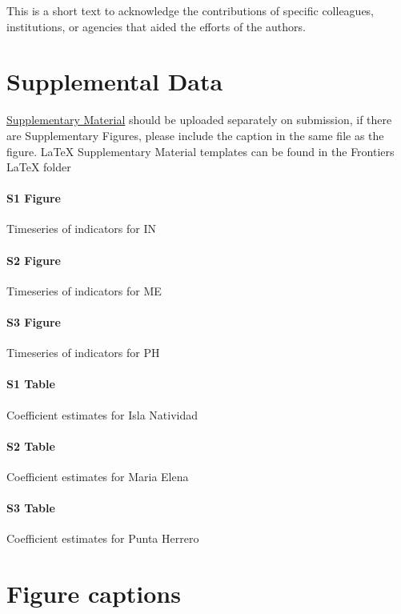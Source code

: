 \documentclass{frontiersSCNS}
\theoremstyle{definition}
\theoremstyle{definition}
\theoremstyle{definition}
\theoremstyle{remark}
\begin{document}
This is a short text to acknowledge the contributions of specific
colleagues, institutions, or agencies that aided the efforts of the
authors.

\section*{Supplemental Data}

\href{http://home.frontiersin.org/about/author-guidelines#SupplementaryMaterial}{Supplementary Material}
should be uploaded separately on submission, if there are Supplementary
Figures, please include the caption in the same file as the figure.
LaTeX Supplementary Material templates can be found in the Frontiers
LaTeX folder

\paragraph*{S1 Figure}
\label{S1_Figure}

Timeseries of indicators for IN

\paragraph*{S2 Figure}
\label{S2_Figure}

Timeseries of indicators for ME

\paragraph*{S3 Figure}
\label{S3_Figure}

Timeseries of indicators for PH

\paragraph*{S1 Table}
\label{S1_Table}

Coefficient estimates for Isla Natividad

\paragraph*{S2 Table}
\label{S2_Table}

Coefficient estimates for Maria Elena

\paragraph*{S3 Table}
\label{S3_Table}

Coefficient estimates for Punta Herrero



\section*{Figure captions}
\end{document}

